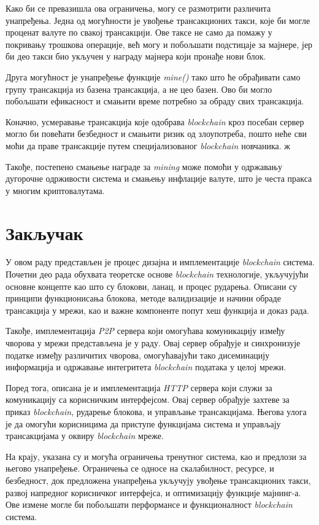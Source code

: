 \documentclass[12pt, a4paper]{article}
\begin{document}
Како би се превазишла ова ограничења, могу се размотрити различита унапређења. Једна од могућности је увођење трансакционих такси, које би могле проценат валуте по свакој трансакцији. Ове таксе не само да помажу у покривању трошкова операције, већ могу и побољшати подстицаје за мајнере, јер би део такси био укључен у награду мајнера који пронађе нови блок.

Друга могућност је унапређење функције \textit{mine()} тако што ће обрађивати само групу трансакција из базена трансакција, а не цео базен. Ово би могло побољшати ефикасност и смањити време потребно за обраду свих трансакција.

Коначно, усмеравање трансакција које одобрава \textit{blockchain} кроз посебан сервер могло би повећати безбедност и смањити ризик од злоупотреба, пошто неће сви моћи да праве трансакције путем специјализованог \textit{blockchain} новчаника. ж

Такође, постепено смањење награде за \textit{mining} може помоћи у одржавању дугорочне одрживости система и смањењу инфлације валуте, што је честа пракса у многим криптовалутама.


\newpage
\section{Закључак}
У овом раду представљен је процес дизајна и имплементације \textit{blockchain} система. Почетни део рада обухвата теоретске основе \textit{blockchain} технологије, укључујући основне концепте као што су блокови, ланац, и процес рударења. Описани су принципи функционисања блокова, методе валидизације и начини обраде трансакција у мрежи, као и важне компоненте попут хеш функција и доказ рада.

Такође, имплементација \textit{P2P} сервера који омогућава комуникацију између чворова у мрежи представљена је у раду. Овај сервер обрађује и синхронизује податке између различитих чворова, омогућавајући тако дисеминацију информација и одржавање интегритета \textit{blockchain} података у целој мрежи.

Поред тога, описана је и имплементација \textit{HTTP} сервера који служи за комуникацију са корисничким интерфејсом. Овај сервер обрађује захтеве за приказ \textit{blockchain}, рударење блокова, и управљање трансакцијама. Његова улога је да омогући корисницима да приступе функцијама система и управљају трансакцијама у оквиру \textit{blockchain} мреже.

На крају, указана су и могућа ограничења тренутног система, као и предлози за његово унапређење. Ограничења се односе на скалабилност, ресурсе, и безбедност, док предложена унапређења укључују увођење трансакционих такси, развој напредног корисничког интерфејса, и оптимизацију функције мајнинг-а. Ове измене могле би побољшати перформансе и функционалност \textit{blockchain} система.
\end{document}
